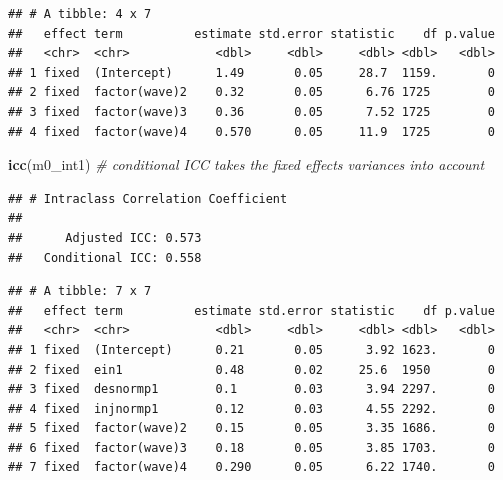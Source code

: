 \documentclass[
]{book}
\newenvironment{Shaded}{\begin{snugshade}}{\end{snugshade}}
\newcommand{\CommentTok}[1]{\textcolor[rgb]{0.56,0.35,0.01}{\textit{#1}}}
\newcommand{\DataTypeTok}[1]{\textcolor[rgb]{0.13,0.29,0.53}{#1}}
\newcommand{\DecValTok}[1]{\textcolor[rgb]{0.00,0.00,0.81}{#1}}
\newcommand{\KeywordTok}[1]{\textcolor[rgb]{0.13,0.29,0.53}{\textbf{#1}}}
\newcommand{\NormalTok}[1]{#1}
\newcommand{\OperatorTok}[1]{\textcolor[rgb]{0.81,0.36,0.00}{\textbf{#1}}}
\newcommand{\StringTok}[1]{\textcolor[rgb]{0.31,0.60,0.02}{#1}}
\begin{document}
\begin{verbatim}
## # A tibble: 4 x 7
##   effect term          estimate std.error statistic    df p.value
##   <chr>  <chr>            <dbl>     <dbl>     <dbl> <dbl>   <dbl>
## 1 fixed  (Intercept)      1.49       0.05     28.7  1159.       0
## 2 fixed  factor(wave)2    0.32       0.05      6.76 1725        0
## 3 fixed  factor(wave)3    0.36       0.05      7.52 1725        0
## 4 fixed  factor(wave)4    0.570      0.05     11.9  1725        0
\end{verbatim}

\begin{Shaded}
\begin{Highlighting}[]
\KeywordTok{icc}\NormalTok{(m0_int1)  }\CommentTok{# conditional ICC takes the fixed effects variances into account}
\end{Highlighting}
\end{Shaded}

\begin{verbatim}
## # Intraclass Correlation Coefficient
## 
##      Adjusted ICC: 0.573
##   Conditional ICC: 0.558
\end{verbatim}

\begin{Shaded}
\end{Shaded}

\begin{verbatim}
## # A tibble: 7 x 7
##   effect term          estimate std.error statistic    df p.value
##   <chr>  <chr>            <dbl>     <dbl>     <dbl> <dbl>   <dbl>
## 1 fixed  (Intercept)      0.21       0.05      3.92 1623.       0
## 2 fixed  ein1             0.48       0.02     25.6  1950        0
## 3 fixed  desnormp1        0.1        0.03      3.94 2297.       0
## 4 fixed  injnormp1        0.12       0.03      4.55 2292.       0
## 5 fixed  factor(wave)2    0.15       0.05      3.35 1686.       0
## 6 fixed  factor(wave)3    0.18       0.05      3.85 1703.       0
## 7 fixed  factor(wave)4    0.290      0.05      6.22 1740.       0
\end{verbatim}
\end{document}
